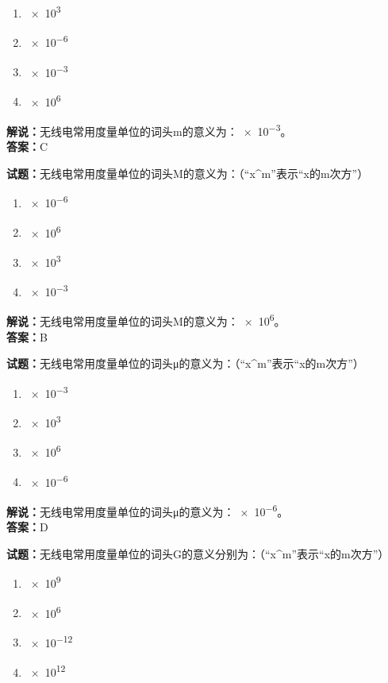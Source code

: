 \documentclass{ctexbook}
\begin{document}
\begin{enumerate}[leftmargin=3em]
  \item \num{e3}%
  \item \num{e-6}%
  \item \num{e-3}%
  \item \num{e6}%
\end{enumerate}

\noindent\textbf{解说：}无线电常用度量单位的词头m的意义为：\num{e-3}。\\
\noindent\textbf{答案：}C

\bigskip

\noindent\textbf{试题：}无线电常用度量单位的词头M的意义为：（“x\string^m”表示“x的m次方”）

\begin{enumerate}[leftmargin=3em]
  \item \num{e-6}%
  \item \num{e6}%
  \item \num{e3}%
  \item \num{e-3}%
\end{enumerate}

\noindent\textbf{解说：}无线电常用度量单位的词头M的意义为：\num{e6}。\\
\noindent\textbf{答案：}B

\bigskip

\noindent\textbf{试题：}无线电常用度量单位的词头μ的意义为：（“x\string^m”表示“x的m次方”）

\begin{enumerate}[leftmargin=3em]
  \item \num{e-3}%
  \item \num{e3}%
  \item \num{e6}%
  \item \num{e-6}%
\end{enumerate}

\noindent\textbf{解说：}无线电常用度量单位的词头μ的意义为：\num{e-6}。\\
\noindent\textbf{答案：}D

\bigskip

\noindent\textbf{试题：}无线电常用度量单位的词头G的意义分别为：（“x\string^m”表示“x的m次方”）

\begin{enumerate}[leftmargin=3em]
  \item \num{e9}%
  \item \num{e6}%
  \item \num{e-12}%
  \item \num{e12}%
\end{enumerate}
\end{document}
